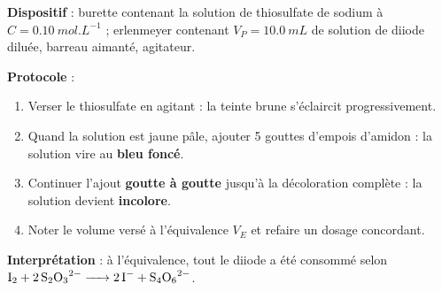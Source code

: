 \documentclass[11pt]{article}
\begin{document}
\begin{experience}
\textbf{Dispositif} : burette contenant la solution de thiosulfate de sodium à $C = \SI{0,10}{mol.L^{-1}}$ ; erlenmeyer contenant $V_P = \SI{10,0}{mL}$ de solution de diiode diluée, barreau aimanté, agitateur.\par
\textbf{Protocole} :
\begin{enumerate}
\item Verser le thiosulfate en agitant : la teinte brune s'éclaircit progressivement.
\item Quand la solution est jaune pâle, ajouter 5 gouttes d'empois d'amidon : la solution vire au \textbf{bleu foncé}.
\item Continuer l'ajout \textbf{goutte à goutte} jusqu'à la décoloration complète : la solution devient \textbf{incolore}.
\item Noter le volume versé à l'équivalence $V_E$ et refaire un dosage concordant.
\end{enumerate}
\textbf{Interprétation} : à l'équivalence, tout le diiode a été consommé selon $\ce{I2 + 2S2O3^2- -> 2I- + S4O6^2-}$.
\end{experience}
\end{document}
